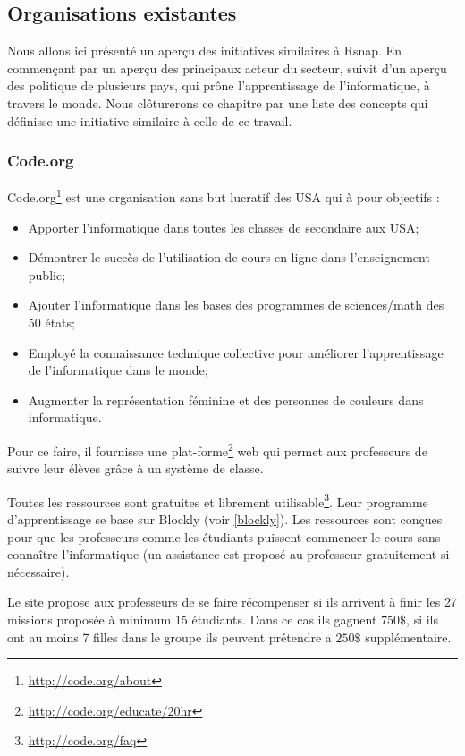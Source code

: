 \subsection{Organisations existantes}
Nous allons ici présenté un aperçu des initiatives similaires à Rsnap. En commençant par un aperçu des principaux acteur du secteur, suivit d'un aperçu des politique de plusieurs pays, qui prône l'apprentissage de l'informatique, à travers le monde. Nous clôturerons ce chapitre par une liste des concepts qui définisse une initiative similaire à celle de ce travail.
\subsubsection{Code.org}
Code.org\footnote{\url{http://code.org/about}} est une organisation sans but lucratif des USA qui à pour objectifs :
\begin{itemize}
  \item Apporter l'informatique dans toutes les classes de secondaire aux USA;
  \item Démontrer le succès de l'utilisation de cours en ligne dans l'enseignement public;
  \item Ajouter l'informatique dans les bases des programmes de sciences/math des 50 états;
  \item Employé la connaissance technique collective pour améliorer l'apprentissage de l'informatique dans le monde;
  \item Augmenter la représentation féminine et des personnes de couleurs dans informatique.
\end{itemize}

Pour ce faire, il fournisse une plat-forme\footnote{\url{http://code.org/educate/20hr}} web qui permet aux professeurs de suivre leur élèves grâce à un système de classe.

Toutes les ressources sont gratuites et librement utilisable\footnote{\url{http://code.org/faq}}. Leur programme d'apprentissage se base sur Blockly (voir \ref{blockly}).
Les ressources sont conçues pour que les professeurs comme les étudiants puissent commencer le cours sans connaître l'informatique (un assistance est proposé au professeur gratuitement si nécessaire).

Le site propose aux professeurs de se faire récompenser si ils arrivent à finir les 27 missions proposée à  minimum 15 étudiants. Dans ce cas ils gagnent $750\$$, si ils ont au moins 7 filles dans le groupe ils peuvent prétendre a $250\$$ supplémentaire.

